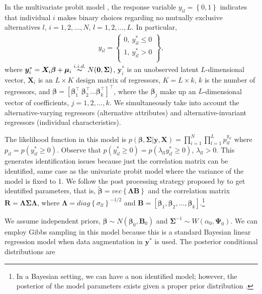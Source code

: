 In the multivariate probit model \cite{Edwards2003}, the response variable $y_{il}=\left\{0,1\right\}$ indicates that individual $i$ makes binary choices regarding no mutually exclusive alternatives $l$, $i=1,2,\dots,N$, $l=1,2,\dots,L$. In particular,
\begin{align*}
	y_{il}=\begin{Bmatrix}
		0, \ y_{il}^*\leq 0 \\ 
		1, \ y_{il}^*> 0 \\ 
	\end{Bmatrix},
\end{align*}
where $\bm{y}_{i}^*=\bm{X}_{i}\bm{\beta}+\bm{\mu}_{i}\stackrel{i.i.d.} {\thicksim}{N}(\bm0,\bm{\Sigma})$, $\bm{y}_i^*$ is an unobserved latent $L$-dimensional vector, $\bm{X}_{i}$ is an $L\times K$ design matrix of regressors, $K=L\times k$, $k$ is the number of regressors, and $\bm{\beta}=\left[\bm{\beta}_1^{\top} \ \bm{\beta}_2^{\top} \dots  \bm{\beta}_k^{\top}\right]^{\top}$, where the $\bm{\beta}_j$ make up an $L$-dimensional vector of coefficients, $j=1,2,\dots,k$. We simultaneously take into account the alternative-varying regressors (alternative attributes) and alternative-invariant regressors (individual characteristics).

The likelihood function in this model is $p(\bm{\beta},\bm{\Sigma}|\bm{y},\bm{X})=\prod_{i=1}^N\prod_{l=1}^L p_{il}^{y_{il}}$ where $p_{il}=p(y_{il}^*\geq 0)$.
Observe that $p({y}_{il}^*\geq 0)=p({\lambda}_{ll}{y}_{il}^*\geq 0)$, $\lambda_{ll}>0$. This generates identification issues because just the correlation matrix can be identified, same case as the univariate probit model where the variance of the model is fixed to 1. We follow the post processing strategy proposed by \cite{Edwards2003} to get identified parameters, that is, $\tilde{\bm{\beta}}=vec\left\{\bm{\Lambda}\bm{B}\right\}$ and the correlation matrix $\bm{R}=\bm{\Lambda}\bm{\Sigma}\bm{\Lambda}$, where $\bm{\Lambda}=diag\left\{\sigma_{ll}\right\}^{-1/2}$ and $\bm{B}=\left[\bm{\beta}_1,\bm{\beta}_2,\dots,\bm{\beta}_k\right]$.\footnote{In a Bayesian setting, we can have a non identified model; however, the posterior of the model parameters exists given a proper prior distribution \cite{Edwards2003}.}

We assume independent priors, $\bm{\beta}\sim{N}(\bm{\beta}_0,\bm{B}_0)$ and $\bm{\Sigma}^{-1}\sim{W}(\alpha_0,\bm{\Psi}_0)$.
We can employ Gibbs sampling in this model because this is a standard Bayesian linear regression model when data augmentation in $\bm{y}^*$ is used.
The posterior conditional distributions are

